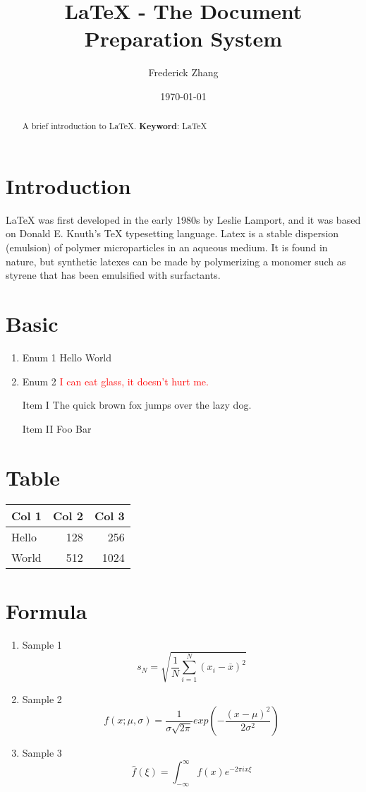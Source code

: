 \documentclass[a4paper,10pt]{article}
\title{LaTeX - The Document Preparation System}
\author{Frederick Zhang}
\date{\today}
\begin{document}
\maketitle

\begin{abstract}
A brief introduction to LaTeX.
\newline\textbf{Keyword}: LaTeX
\end{abstract}

\section{Introduction}
LaTeX was first developed in the early 1980s by Leslie Lamport, and it was based on Donald E. Knuth's TeX typesetting language. \autocite{8732314920150101}
\newline Latex is a stable dispersion (emulsion) of polymer microparticles in an aqueous medium. It is found in nature, but synthetic latexes can be made by polymerizing a monomer such as styrene that has been emulsified with surfactants. \autocite{LaTeXWiki}

\section{Basic}
\begin{enumerate}
  \item Enum 1
  \newline Hello World
  
  \item Enum 2
  \newline \textcolor{red}{I can eat glass, it doesn't hurt me.}
\end{enumerate}
\begin{itemize}
  \item [Item I] The quick brown fox jumps over the lazy dog.
  \item [Item II] Foo Bar
\end{itemize}

\section{Table}
\begin{tabular}{l | r | r}
  Col 1 & Col 2 & Col 3 \\ \hline
  Hello & 128 & 256 \\
  World & 512 & 1024
\end{tabular}

\section{Formula}
\begin{enumerate}
  \item Sample 1
  $$ s_N=\sqrt{\frac{1}{N} \sum_{i=1}^{N} (x_i - \overline{x})^2} $$
  
  \item Sample 2
  $$ f(x;\mu,\sigma) = \frac{1}{\sigma\sqrt{2\pi}}exp(-\frac{(x-\mu)^2}{2\sigma^2}) $$
  
  \item Sample 3
  $$ \hat{f}(\xi)=\int_{-\infty}^{\infty} f(x) e^{-2\pi ix\xi} $$
\end{enumerate}
\end{document}
